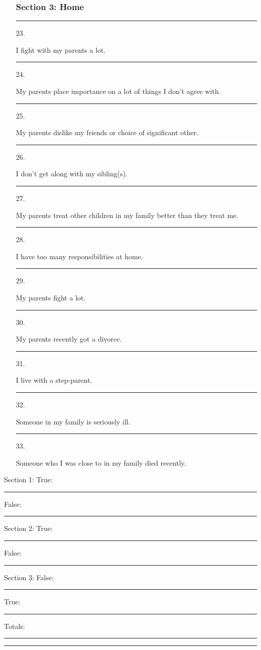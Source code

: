 \documentclass[letterpaper, 12pt]{article}
\begin{document}
\begin{enumerate}
    \subsubsection*{Section 3: Home}
    \item [\rule{0.3in}{0.01in} 23.] I fight with my parents a lot. 
    \item [\rule{0.3in}{0.01in} 24.] My parents place importance on a lot of things I don't agree with. 
    \item [\rule{0.3in}{0.01in} 25.] My parents dislike my friends or choice of significant other. 
    \item [\rule{0.3in}{0.01in} 26.] I don't get along with my sibling(s).
    \item [\rule{0.3in}{0.01in} 27.] My parents treat other children in my family better than they treat me. 
    \item [\rule{0.3in}{0.01in} 28.] I have too many responsibilities at home. 
    \item [\rule{0.3in}{0.01in} 29.] My parents fight a lot. 
    \item [\rule{0.3in}{0.01in} 30.] My parents recently got a divorce.  
    \item [\rule{0.3in}{0.01in} 31.] I live with a step-parent.
    \item [\rule{0.3in}{0.01in} 32.] Someone in my family is seriously ill. 
    \item [\rule{0.3in}{0.01in} 33.] Someone who I was close to in my family died recently.  
 	
\end{enumerate}

\vspace{.5in}

Section 1: True: \rule{0.5in}{0.01in} \hspace{0.5 in} False: \rule{0.5in}{0.01in}

Section 2: True: \rule{0.5in}{0.01in} \hspace{0.5 in} False: \rule{0.5in}{0.01in}

Section 3: False: \rule{0.5in}{0.01in} \hspace{0.5 in} True: \rule{0.5in}{0.01in}

Totals:  \hspace{0.6in}  \rule{0.5in}{0.01in} \hspace{.95 in} \rule{0.5in}{0.01in}
\end{document}
